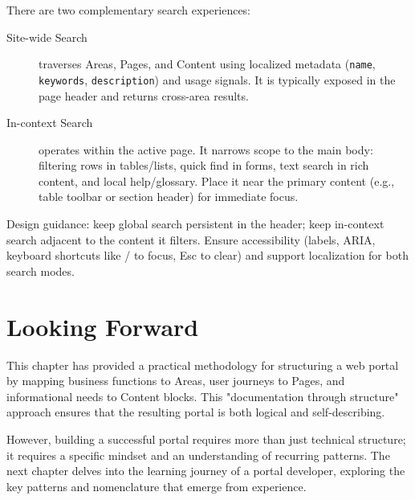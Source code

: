 There are two complementary search experiences:
\begin{description}
  \item[Site-wide Search] traverses Areas, Pages, and Content using localized metadata (\texttt{name}, \texttt{keywords}, \texttt{description}) and usage signals. It is typically exposed in the page header and returns cross-area results.
  \item[In-context Search] operates within the active page. It narrows scope to the main body: filtering rows in tables/lists, quick find in forms, text search in rich content, and local help/glossary. Place it near the primary content (e.g., table toolbar or section header) for immediate focus.
\end{description}

Design guidance: keep global search persistent in the header; keep in-context search adjacent to the content it filters. Ensure accessibility (labels, ARIA, keyboard shortcuts like / to focus, Esc to clear) and support localization for both search modes.

\section{Looking Forward}
\label{sec:portal-structure-forward}

This chapter has provided a practical methodology for structuring a web portal by mapping business functions to Areas, user journeys to Pages, and informational needs to Content blocks. This "documentation through structure" approach ensures that the resulting portal is both logical and self-describing.

However, building a successful portal requires more than just technical structure; it requires a specific mindset and an understanding of recurring patterns. The next chapter delves into the learning journey of a portal developer, exploring the key patterns and nomenclature that emerge from experience.
